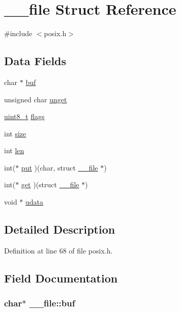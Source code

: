 \hypertarget{struct____file}{\section{\-\_\-\-\_\-file Struct Reference}
\label{struct____file}
}


{\ttfamily \#include $<$posix.\-h$>$}

\subsection*{Data Fields}
\begin{DoxyCompactItemize}
\item 
char $\ast$ \hyperlink{struct____file_a3e5a85ae919a90efbb7cb44ccb54fe46}{buf}
\item 
unsigned char \hyperlink{struct____file_a1d139ae3cb11a1fada469a49f7d3d3b6}{unget}
\item 
\hyperlink{send_8c_aba7bc1797add20fe3efdf37ced1182c5}{uint8\-\_\-t} \hyperlink{struct____file_a8d11df8679502efee09740f97d7c277b}{flags}
\item 
int \hyperlink{struct____file_aff4a1ca8b6a12460812928afae81248d}{size}
\item 
int \hyperlink{struct____file_a30309efd13a75ed510bb2370debafaf8}{len}
\item 
int($\ast$ \hyperlink{struct____file_ac30baaec720d36ed503f35ae50bcec13}{put} )(char, struct \hyperlink{struct____file}{\-\_\-\-\_\-file} $\ast$)
\item 
int($\ast$ \hyperlink{struct____file_a467262b28adfee5f6fb6df42de293071}{get} )(struct \hyperlink{struct____file}{\-\_\-\-\_\-file} $\ast$)
\item 
void $\ast$ \hyperlink{struct____file_abe6f3bdb4df4119277132eb3e13a4628}{udata}
\end{DoxyCompactItemize}


\subsection{Detailed Description}


Definition at line 68 of file posix.\-h.



\subsection{Field Documentation}
\hypertarget{struct____file_a3e5a85ae919a90efbb7cb44ccb54fe46}{
\subsubsection[{buf}]{\setlength{\rightskip}{0pt plus 5cm}char$\ast$ \-\_\-\-\_\-file\-::buf}}\label{struct____file_a3e5a85ae919a90efbb7cb44ccb54fe46}



